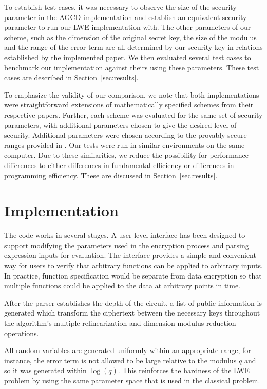 \documentclass[letterpaper,twocolumn,10pt]{article}
\begin{document}
To establish test cases, it was necessary to observe the size of the security parameter in the AGCD implementation and establish an equivalent security parameter to run our LWE implementation with. The other parameters of our scheme, such as the dimension of the original secret key, the size of the modulus and the range of the error term are all determined by our security key in relations established by the implemented paper\cite{StandardLWE}. We then evaluated several test cases to benchmark our implementation against theirs using these parameters. These test cases are described in Section~\ref{sec:results}.

To emphasize the validity of our comparison, we note that both implementations were straightforward extensions of mathematically specified schemes from their respective papers. Further, each scheme was evaluated for the same set of security parameters, with additional parameters chosen to give the desired level of security. Additional parameters were chosen according to the provably secure ranges provided in \cite{StandardLWE, CNT}. Our tests were run in similar environments on the same computer. Due to these similarities, we reduce the possibility for performance differences to either differences in fundamental efficiency or differences in programming efficiency. These are discussed in Section~\ref{sec:results}.


\section{Implementation}
The code works in several stages. A user-level interface has been designed to support modifying the parameters used in the encryption process and parsing expression inputs for evaluation. The interface provides a simple and convenient way for users to verify that arbitrary functions can be applied to arbitrary inputs. In practice, function specification would be separate from data encryption so that multiple functions could be applied to the data at arbitrary points in time.

After the parser establishes the depth of the circuit, a list of public information is generated which transform the ciphertext between the necessary keys throughout the algorithm's multiple relinearization and dimension-modulus reduction operations.

All random variables are generated uniformly within an appropriate range, for instance, the error term is not allowed to be large relative to the modulus $q$ and so it was generated within $\log(q)$. This reinforces the hardness of the LWE problem by using the same parameter space that is used in the classical problem.
\end{document}
